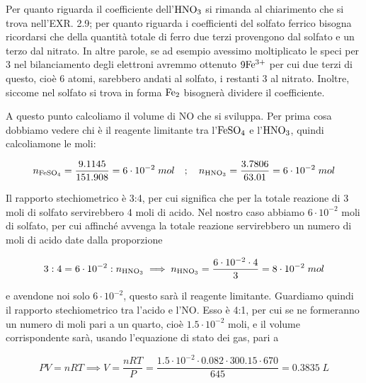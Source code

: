Per quanto riguarda il coefficiente dell'$\rm HNO_3$ si rimanda al chiarimento che si trova nell'EXR. 2.9; per quanto riguarda i coefficienti del solfato ferrico bisogna ricordarsi che della quantità totale di ferro due terzi provengono dal solfato e un terzo dal nitrato. In altre parole, se ad esempio avessimo moltiplicato le speci per 3 nel bilanciamento degli elettroni avremmo ottenuto $\rm 9Fe^{3+}$ per cui due terzi di questo, cioè 6 atomi, sarebbero andati al solfato, i restanti 3 al nitrato. Inoltre, siccome nel solfato si trova in forma $\rm Fe_2$ bisognerà dividere il coefficiente.

A questo punto calcoliamo il volume di NO che si sviluppa. Per prima cosa dobbiamo vedere chi è il reagente limitante tra l'$\rm FeSO_4$ e l'$\rm HNO_3$, quindi calcoliamone le moli:

$$n_{\rm FeSO_4}=\frac{9.1145}{151.908}
=6 \cdot 10^{-2}\;mol
\quad;\quad
n_{\rm HNO_3}=\frac{3.7806}{63.01}
=6 \cdot 10^{-2}\;mol$$

Il rapporto stechiometrico è 3:4, per cui significa che per la totale reazione di 3 moli di solfato servirebbero 4 moli di acido. Nel nostro caso abbiamo $6 \cdot 10^{-2}$ moli di solfato, per cui affinché avvenga la totale reazione servirebbero un numero di moli di acido date dalla proporzione

$$3:4=6 \cdot 10^{-2}:n_{\rm HNO_3}
\implies
n_{\rm HNO_3}=\frac{6 \cdot 10^{-2} \cdot 4}{3}
=8 \cdot 10^{-2}\;mol$$

e avendone noi solo $6 \cdot 10^{-2}$, questo sarà il reagente limitante. Guardiamo quindi il rapporto stechiometrico tra l'acido e l'NO. Esso è 4:1, per cui se ne formeranno un numero di moli pari a un quarto, cioè $1.5 \cdot 10^{-2}$ moli, e il volume corrispondente sarà, usando l'equazione di stato dei gas, pari a 

$$PV=nRT
\implies
V=\frac{nRT}{P}
=\frac{1.5 \cdot 10^{-2} \cdot 0.082 \cdot 300.15 \cdot 670}{645}
=0.3835\;L$$
